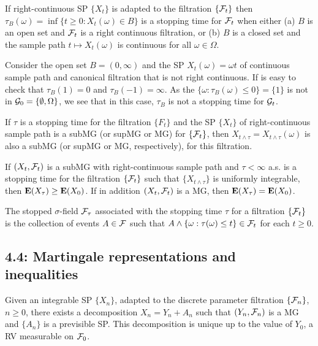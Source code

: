 \begin{proposition*} 
If right-continuous SP $\{X_t\}$ is adapted to the filtration $\{\mathcal{F}_t\}$ then
$\tau_B(\omega) = \inf\{t \ge 0: X_t(\omega) \in B\}$ is a stopping time for
$\mathcal{F}_t$ when either (a) $B$ is an open set and $\mathcal{F}_t$ is a right continuous
filtration, or (b) $B$ is a closed set and the sample path $t \mapsto
X_t(\omega)$ is continuous for all $\omega \in \Omega$.
\end{proposition*} 

\begin{example*} 
Consider the open set $B = (0, \infty)$ and the SP $X_t(\omega) = \omega t$ of
continuous sample path and canonical filtration that is not right continuous. If
is easy to check that $\tau_B(1) = 0$ and $\tau_B(-1) = \infty$. As the
$\{\omega: \tau_B(\omega) \le 0\} = \{1\}$ is not in $\mathcal{G}_0 = \{\emptyset,
\Omega\}$, we see that in this case, $\tau_B$ is not a stopping time for $\mathcal{G}_t$.
\end{example*} 

\begin{theorem*} 
If $\tau$ is a stopping time for the filtration $\{F_t\}$ and the SP $\{X_t\}$
of right-continuous sample path is a subMG (or supMG or MG) for $\{\mathcal{F}_t\}$, then
$X_{t \land \tau} = X_{t \land \tau} (\omega)$ is also a subMG (or supMG or MG,
respectively), for this filtration.
\end{theorem*} 

\begin{theorem*}
If $(X_t, \mathcal{F}_t)$ is a subMG with right-continuous sample path and $\tau <
\infty$ a.s. is a stopping time for the filtration $\{\mathcal{F}_t\}$ such that
$\{X_{t \land \tau}\}$ is uniformly integrable, then $\mathbf{E}(X_\tau) \ge \mathbf{E}(X_0)$.
If in addition $(X_t, \mathcal{F}_t)$ is a MG, then $\mathbf{E}(X_\tau) = \mathbf{E}(X_0)$.
\end{theorem*} 

\begin{definition*} 
The stopped $\sigma$-field $\mathcal{F}_\tau$ associated with the stopping time $\tau$
for a filtration $\{\mathcal{F}_t\}$ is the collection of events $A \in \mathcal{F}$ such that
$A \land \{\omega: \tau(\omega) \le t\} \in \mathcal{F}_t$ for each $t \ge 0$.
\end{definition*} 



\subsection*{4.4: Martingale representations and inequalities}
\begin{theorem*} 
Given an integrable SP $\{X_n\}$, adapted to the discrete parameter filtration
$\{\mathcal{F}_n\}$, $n \ge 0$, there exists a decomposition $X_n = Y_n + A_n$ such that
$(Y_n, \mathcal{F}_n)$ is a MG and $\{A_n\}$ is a previsible SP. This decomposition is
unique up to the value of $Y_0$, a RV measurable on $\mathcal{F}_0$.
\end{theorem*} 

